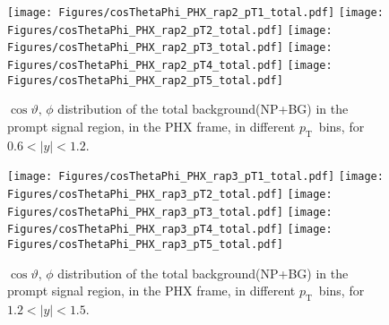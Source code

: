 \documentclass[12pt]{article}
\newcommand{\pt}{$p_{\mathrm{T}}$}
\begin{document}
\begin{figure}[htbp]
\centering
\texttt{[image: Figures/cosThetaPhi\_PHX\_rap2\_pT1\_total.pdf]}
\texttt{[image: Figures/cosThetaPhi\_PHX\_rap2\_pT2\_total.pdf]}
\texttt{[image: Figures/cosThetaPhi\_PHX\_rap2\_pT3\_total.pdf]}
\texttt{[image: Figures/cosThetaPhi\_PHX\_rap2\_pT4\_total.pdf]}
\texttt{[image: Figures/cosThetaPhi\_PHX\_rap2\_pT5\_total.pdf]}
\caption{$\cos\vartheta,\,\phi$ distribution of the total background(NP+BG) in the prompt signal region, 
	in the PHX frame, in different \pt\ bins, for $0.6 < |y| < 1.2$.}
\end{figure}
\clearpage

\begin{figure}[htbp]
\centering
\texttt{[image: Figures/cosThetaPhi\_PHX\_rap3\_pT1\_total.pdf]}
\texttt{[image: Figures/cosThetaPhi\_PHX\_rap3\_pT2\_total.pdf]}
\texttt{[image: Figures/cosThetaPhi\_PHX\_rap3\_pT3\_total.pdf]}
\texttt{[image: Figures/cosThetaPhi\_PHX\_rap3\_pT4\_total.pdf]}
\texttt{[image: Figures/cosThetaPhi\_PHX\_rap3\_pT5\_total.pdf]}
\caption{$\cos\vartheta,\,\phi$ distribution of the total background(NP+BG) in the prompt signal region, 
	in the PHX frame, in different \pt\ bins, for $1.2 < |y| < 1.5$.}
\end{figure}
\clearpage
\end{document}
